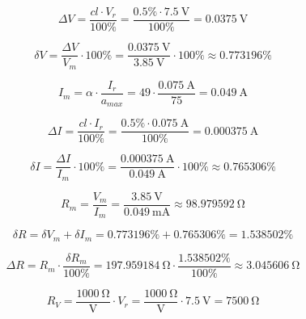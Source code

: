 \begin{equation}
	\Delta V = \frac{cl\cdot V_r}{100\unit{\percent}} = \frac{0.5\unit{\percent}\cdot\SI{7.5}{\volt}}{100\unit{\percent}} = \SI{0.0375}{\volt}
\end{equation}

\begin{equation}
	\delta V = \frac{\Delta V}{V_m}\cdot 100\unit{\percent} = \frac{\SI{0.0375}{\volt}}{\SI{3.85}{\volt}}\cdot 100\unit{\percent}\approx 0.773196\unit{\percent}
\end{equation}

\begin{equation}
	I_m = \alpha\cdot\frac{I_r}{a_{max}} = 49\cdot\frac{\SI{0.075}{\ampere}}{75} = \SI{0.049}{\ampere} 
\end{equation}

\begin{equation}
	\Delta I = \frac{cl\cdot I_r}{100\unit{\percent}} = \frac{0.5\unit{\percent}\cdot\SI{0.075}{\ampere}}{100\unit{\percent}} = \SI{0.000375}{\ampere}
\end{equation}

\begin{equation}
	\delta I  = \frac{\Delta I}{I_m}\cdot 100\unit{\percent} = \frac{\SI{0.000375}{\ampere}}{\SI{0.049}{\ampere} }\cdot 100\unit{\percent}\approx 0.765306\unit{\percent}
\end{equation}

\begin{equation}
	R_m = \frac{V_m}{I_m} = \frac{\SI{3.85}{\volt}}{\SI{0.049}{\milli\ampere}} \approx \SI{98.979592}{\ohm} 
\end{equation}

\begin{equation}
	\delta R = \delta V_m + \delta I_m = 0.773196\unit{\percent} + 0.765306\unit{\percent} = 1.538502\unit{\percent}
\end{equation}

\begin{equation}
	\Delta R = R_m\cdot\frac{\delta R_m}{100\unit{\percent}}  =  \SI{197.959184}{\ohm} \cdot\frac{1.538502\unit{\percent}}{100\unit{\percent}} \approx \SI{3.045606}{\ohm}
\end{equation}

\begin{equation}
	R_V = \frac{\SI{1000}{\ohm}}{\unit{\volt}} \cdot V_r =  \frac{\SI{1000}{\ohm}}{\unit{\volt}} \cdot \SI{7.5}{\volt} = \SI{7500}{\ohm}
\end{equation}

